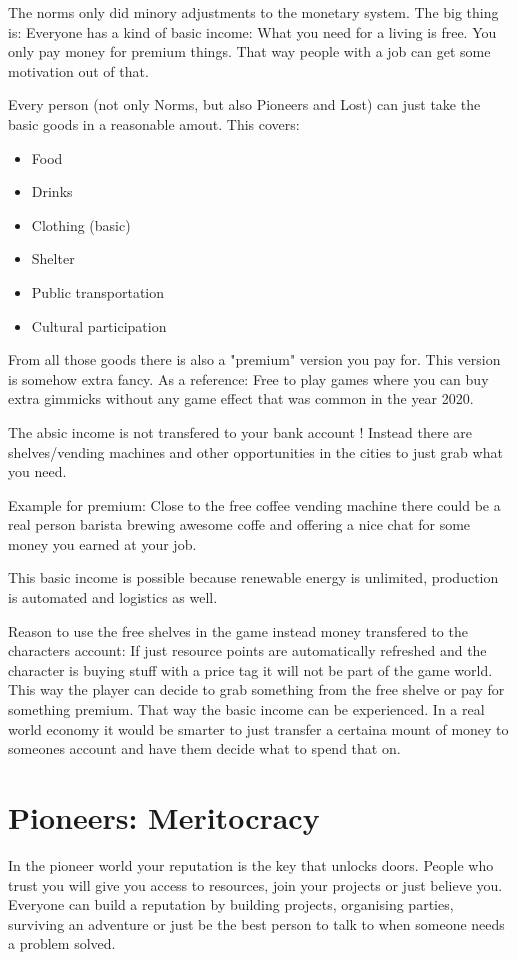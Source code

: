 The norms only did minory adjustments to the monetary system. The big thing is: Everyone has a kind of basic income: What you need for a living is free.
You only pay money for premium things. That way people with a job can get some motivation out of that.

Every person (not only Norms, but also Pioneers and Lost) can just take the basic goods in a reasonable amout. This covers:

\begin{itemize}
    \item Food
    \item Drinks
    \item Clothing (basic)
    \item Shelter
    \item Public transportation
    \item Cultural participation
\end{itemize}

From all those goods there is also a "premium" version you pay for. This version is somehow extra fancy. As a reference: Free to play games where you can buy extra gimmicks without any game effect that was common in the year 2020.

The absic income is not transfered to your bank account ! Instead there are shelves/vending machines and other opportunities in the cities to just grab what you need.

Example for premium: Close to the free coffee vending machine there could be a real person barista brewing awesome coffe and offering a nice chat for some money you earned at your job.

This basic income is possible because renewable energy is unlimited, production is automated and logistics as well.

\begin{reason}[]
    Reason to use the free shelves in the game instead money transfered to the characters account: If just resource points are automatically refreshed and the character is buying stuff with a price tag it will not be part of the game world. This way the player can decide to grab something from the free shelve or pay for something premium. That way the basic income can be experienced. In a real world economy it would be smarter to just transfer a certaina mount of money to someones account and have them decide what to spend that on.
\end{reason}

\section{Pioneers: Meritocracy}
\label{sec:meritocracy}

In the pioneer world your reputation is the key that unlocks doors. People who trust you will give you access to resources, join your projects or just believe you.
Everyone can build a reputation by building projects, organising parties, surviving an adventure or just be the best person to talk to when someone needs a problem solved.
